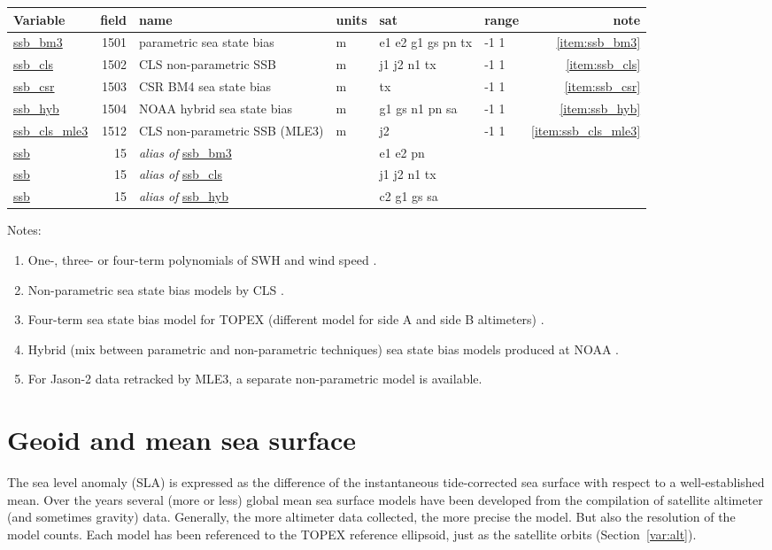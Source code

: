 \documentclass[a4paper,11pt,openany,natbib]{thesis}
\makeatletter
\newcommand\var[1]{\url{#1}\index{variables!#1@\protect\url{#1}}}
\newcommand\alias[1]{\emph{alias of} \var{#1}}
\newenvironment{vartable}{
\begin{table}[ht]
\small
\begin{tabular}{lrllllr}
\hline
Variable & field & name & units & sat & range & note \\
\hline
}{
\hline
\end{tabular}
\end{table}
}
\makeatother
\begin{document}
\begin{vartable}
\var{ssb_bm3} & 1501 & parametric sea state bias & m & e1 e2 g1 gs pn tx & -1 1 & \ref{item:ssb_bm3} \\
\var{ssb_cls} & 1502 & CLS non-parametric SSB & m & j1 j2 n1 tx       & -1 1 & \ref{item:ssb_cls} \\
\var{ssb_csr} & 1503 & CSR BM4 sea state bias & m & tx                & -1 1 & \ref{item:ssb_csr} \\
\var{ssb_hyb} & 1504 & NOAA hybrid sea state bias & m & g1 gs n1 pn sa & -1 1 & \ref{item:ssb_hyb} \\
\var{ssb_cls_mle3} & 1512 & CLS non-parametric SSB (MLE3) & m & j2      & -1 1 & \ref{item:ssb_cls_mle3} \\
\hline
\var{ssb}     &   15 & \alias{ssb_bm3} && e1 e2 pn && \\
\var{ssb}     &   15 & \alias{ssb_cls} && j1 j2 n1 tx && \\
\var{ssb}     &   15 & \alias{ssb_hyb} && c2 g1 gs sa && \\
\end{vartable}

Notes:
\begin{enumerate}
\item One-, three- or four-term polynomials of SWH and wind speed \citep{gaspar1994a}.\label{item:ssb_bm3}
\item Non-parametric sea state bias models by CLS \citep{gaspar2002,labroue2004}.\label{item:ssb_cls}
\item Four-term sea state bias model for TOPEX (different model for side A and side B altimeters) \citep{chambers2003a}.\label{item:ssb_csr}
\item Hybrid (mix between parametric and non-parametric techniques) sea state bias models produced at NOAA \citep{scharroo2005e}.\label{item:ssb_hyb}
\item For Jason-2 data retracked by MLE3, a separate non-parametric model is available.\label{item:ssb_cls_mle3}
\end{enumerate}

\section{Geoid and mean sea surface}
\label{var:geoid}\label{var:mss}
The sea level anomaly (SLA) is expressed as the difference of the instantaneous tide-corrected sea surface with respect to a well-established mean. Over the years several (more or less) global mean sea surface models have been developed from the compilation of satellite altimeter (and sometimes gravity) data. Generally, the more altimeter data collected, the more precise the model. But also the resolution of the model counts. Each model has been referenced to the TOPEX reference ellipsoid, just as the satellite orbits (Section~\ref{var:alt}).
\end{document}
